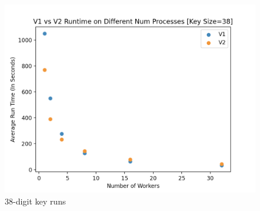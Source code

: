 \documentclass[11pt,twocolumn]{article}
\begin{document}
\begin{figure}[!htb]
    \centering
    \includegraphics[scale = 0.2]{38.png}
    \caption{38-digit key runs}
    \label{38dig}
\end{figure}
\end{document}
